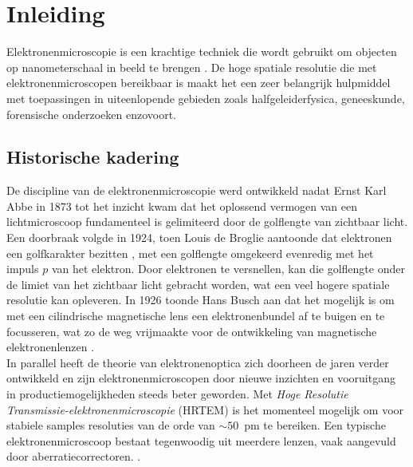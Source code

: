 \documentclass[we,twoside,openright,a4paper,11pt]{uantwerpenbamathesis}
\begin{document}
\makeatother

\pagestyle{fancy}

\chapter{Inleiding}\label{ch:inleiding}
Elektronenmicroscopie is een krachtige techniek die wordt gebruikt om objecten op nanometerschaal in beeld te brengen \cite{EM_Overview}. De hoge spatiale resolutie die met elektronenmicroscopen bereikbaar is maakt het een zeer belangrijk hulpmiddel met toepassingen in uiteenlopende gebieden zoals halfgeleiderfysica, geneeskunde, forensische onderzoeken enzovoort. 

\section{Historische kadering}De discipline van de elektronenmicroscopie werd ontwikkeld nadat Ernst Karl Abbe in 1873 tot het inzicht kwam dat het oplossend vermogen van een lichtmicroscoop fundamenteel is gelimiteerd door de golflengte van zichtbaar licht. Een doorbraak volgde in 1924, toen Louis de Broglie aantoonde dat elektronen een golfkarakter bezitten \cite{deBroglie1924}, met een golflengte omgekeerd evenredig met het impuls $p$ van het elektron. Door elektronen te versnellen, kan die golflengte onder de limiet van het zichtbaar licht gebracht worden, wat een veel hogere spatiale resolutie kan opleveren. In 1926 toonde Hans Busch aan dat het mogelijk is om met een cilindrische magnetische lens een elektronenbundel af te buigen en te focusseren, wat zo de weg vrijmaakte voor de ontwikkeling van magnetische elektronenlenzen \cite{Busch1926}.\\

In parallel heeft de theorie van elektronenoptica zich doorheen de jaren verder ontwikkeld en zijn elektronenmicroscopen door nieuwe inzichten en vooruitgang in productiemogelijkheden steeds beter geworden. Met \textit{Hoge Resolutie Transmissie-elektronenmicroscopie} (HRTEM) is het momenteel mogelijk om voor stabiele samples resoluties van de orde van $\sim50$~pm te bereiken. Een typische elektronenmicroscoop bestaat tegenwoodig uit meerdere lenzen, vaak aangevuld door aberratiecorrectoren. \cite{MyscopeCourse}. \\
\end{document}
